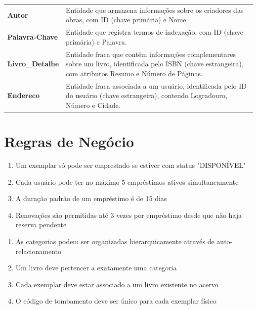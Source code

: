 \documentclass[12pt,a4paper]{article}
\begin{document}
\begin{conceptbox}
\begin{tabularx}{\textwidth}{>{\bfseries}lX}
    Autor & Entidade que armazena informações sobre os criadores das obras, com ID (chave primária) e Nome. \\[1ex]
    
    Palavra-Chave & Entidade que registra termos de indexação, com ID (chave primária) e Palavra. \\[1ex]
    
    Livro\_Detalhe & Entidade fraca que contém informações complementares sobre um livro, identificada pelo ISBN (chave estrangeira), com atributos Resumo e Número de Páginas. \\[1ex]
    
    Endereco & Entidade fraca associada a um usuário, identificada pelo ID do usuário (chave estrangeira), contendo Logradouro, Número e Cidade.
\end{tabularx}
\end{conceptbox}

\section{Regras de Negócio}

\begin{conceptbox}
\begin{enumerate}[label=\textbf{RE\arabic*.}]
    \item Um exemplar só pode ser emprestado se estiver com status "DISPONÍVEL"
    \item Cada usuário pode ter no máximo 5 empréstimos ativos simultaneamente
    \item A duração padrão de um empréstimo é de 15 dias
    \item Renovações são permitidas até 3 vezes por empréstimo desde que não haja reserva pendente
\end{enumerate}
\end{conceptbox}

\begin{conceptbox}
\begin{enumerate}[label=\textbf{RC\arabic*.}]
    \item As categorias podem ser organizadas hierarquicamente através de auto-relacionamento
    \item Um livro deve pertencer a exatamente uma categoria
    \item Cada exemplar deve estar associado a um livro existente no acervo
    \item O código de tombamento deve ser único para cada exemplar físico
\end{enumerate}
\end{conceptbox}
\end{document}
